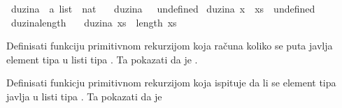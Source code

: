 \begin{isabellebody}
\begin{exercise}[subtitle=Algebarski tip podataka: lista.]
\isamarkupfalse%
\ duzina\ {\isacharcolon}{\kern0pt}{\isacharcolon}{\kern0pt}\ {\isachardoublequoteopen}{\isacharprime}{\kern0pt}a\ list\ {\isasymRightarrow}\ nat{\isachardoublequoteclose}\ \isanewline
\ \ {\isachardoublequoteopen}duzina\ {\isacharbrackleft}{\kern0pt}{\isacharbrackright}{\kern0pt}\ {\isacharequal}{\kern0pt}\ undefined{\isachardoublequoteclose}\isanewline
{\isacharbar}{\kern0pt}\ {\isachardoublequoteopen}duzina\ {\isacharparenleft}{\kern0pt}x\ {\isacharhash}{\kern0pt}\ xs{\isacharparenright}{\kern0pt}\ {\isacharequal}{\kern0pt}\ undefined{\isachardoublequoteclose}\isanewline
\isanewline
{}\isamarkupfalse%
\ duzina{\isacharunderscore}{\kern0pt}length{\isacharcolon}{\kern0pt}\isanewline
\ \ \ {\isachardoublequoteopen}duzina\ xs\ {\isacharequal}{\kern0pt}\ length\ xs{\isachardoublequoteclose}\isanewline
\ \ %
\isadelimproof
%
\endisadelimproof
%
\isatagproof
%
\endisatagproof
{\isafoldproof}%
%
\isadelimproof
%
\endisadelimproof
%
\begin{isamarkuptext}%
Definisati funkciju  primitivnom rekurzijom 
      koja računa koliko se puta javlja element tipa  u listi tipa . 
      Ta pokazati da je .%
\end{isamarkuptext}\isamarkuptrue%
%
\begin{isamarkuptext}%
Definisati funkicju  primitivnom rekurzijom
      koja ispituje da li se element tipa  javlja u listi tipa .
      Ta pokazati da je %

\end{isamarkuptext}
\end{exercise}
\end{isabellebody}
